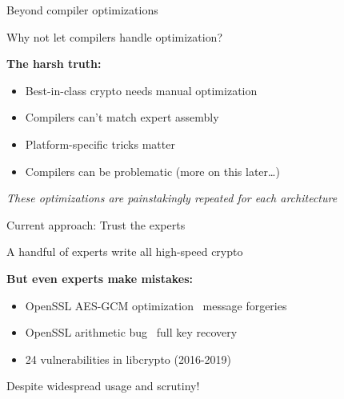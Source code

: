 \documentclass[aspectratio=169, lualatex, handout]{beamer}
\begin{document}
\begin{frame}{Beyond compiler optimizations}
	\begin{center}
		\Large
		Why not let compilers handle optimization?
	\end{center}
	\vspace{1em}
	\textbf{The harsh truth:}
	\begin{itemize}
		\item Best-in-class crypto needs manual optimization
		\item Compilers can't match expert assembly
		\item Platform-specific tricks matter
		\item Compilers can be problematic (more on this later\ldots)
	\end{itemize}
	\vspace{0.5em}
	\begin{center}
		\textit{These optimizations are painstakingly repeated for each architecture}
	\end{center}
\end{frame}

\begin{frame}{Current approach: Trust the experts}
	\begin{center}
		\Large
		A handful of experts write all high-speed crypto
	\end{center}
	\vspace{1em}
	\textbf{But even experts make mistakes:}
	\begin{itemize}
		\item OpenSSL AES-GCM optimization \rightarrow\ message forgeries
		\item OpenSSL arithmetic bug \rightarrow\ full key recovery
		\item 24 vulnerabilities in libcrypto (2016-2019)
	\end{itemize}
	\vspace{0.5em}
	\begin{center}
		Despite widespread usage and scrutiny!
	\end{center}
\end{frame}
\end{document}
